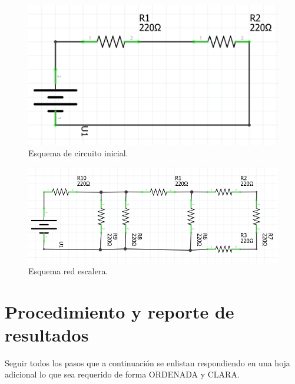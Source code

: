 \documentclass[letterpaper, 12 pt, conference]{ieeeconf}  %
\begin{document}
\begin{figure}[h!]
    \centering
    \includegraphics[scale=0.7]{C1.png}
    \caption{Esquema de circuito inicial.}
\end{figure}

\begin{figure}[h!]
    \centering
    \includegraphics[scale=0.5]{C2.png}
    \caption{Esquema red escalera.}
\end{figure}


\section{Procedimiento y reporte de resultados}
Seguir todos los pasos que a continuación se enlistan respondiendo en una hoja adicional lo que sea requerido de forma ORDENADA y CLARA.
\end{document}
